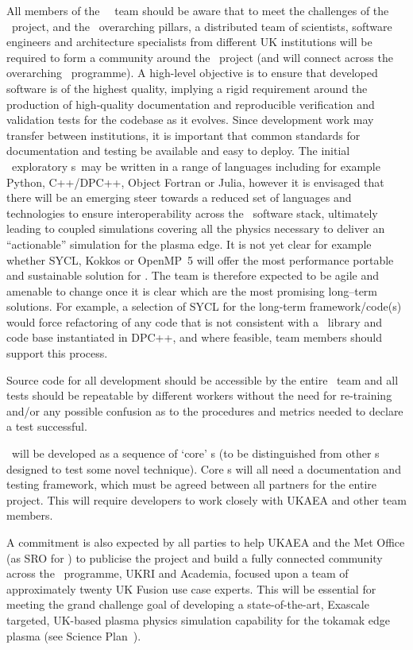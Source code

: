 All members of the \exc \   \nep \   team should be aware that 
to meet the challenges of the \nep \   project, and the \exc \   overarching 
pillars, a distributed team of scientists, software engineers and architecture 
specialists from different UK institutions will be required to form a community 
around the \nep \  project (and will connect across the overarching \exc \   
programme). A high-level objective is to ensure that developed software is of 
the highest quality, implying a rigid requirement around the production of 
high-quality documentation and reproducible verification and validation tests 
for the codebase as it evolves. Since development work may transfer between 
institutions, it is important that common standards for documentation and 
testing be available and easy to deploy. The initial \nep \   exploratory 
\Papp s~may be written in a range of languages including for example Python, 
C++/DPC++, Object Fortran or Julia, however it is envisaged that there will be 
an emerging steer towards a reduced set of languages and technologies to ensure 
interoperability across the \nep \   software stack, ultimately leading to 
coupled simulations covering all the physics necessary to deliver an 
``actionable'' simulation for the plasma edge. It is not yet clear for 
example whether SYCL, Kokkos or OpenMP~5 will offer the most performance 
portable and sustainable solution for \nep.
The team is therefore expected to be agile and amenable 
to change once it is clear which are the most promising long--term solutions. 
For example, a selection of SYCL for the long-term framework/code(s) would 
force refactoring of any code that is not consistent with a \nep \   library and 
code base instantiated in DPC++, and where feasible, team members 
should support this process.


Source code for all development should be accessible by the 
entire \nep \   team and all tests should be repeatable by different workers 
without the need for re-training and/or any possible confusion as to the 
procedures and metrics needed to declare a 
test successful.

\nep \   will be developed as a sequence of `core' \Papp s 
(to be distinguished from other \Papp s designed to test some novel 
technique). Core \Papp s will all need a documentation and testing framework, 
which must be agreed between all partners for the entire project. This will 
require developers to work closely with UKAEA and other team members.

A commitment is also expected by all parties to help UKAEA 
and the Met Office (as SRO for \exc) to publicise the project and build a 
fully connected community across the \exc \   programme, UKRI and Academia, 
focused upon a team of approximately twenty UK Fusion use case experts. This will 
be essential for meeting the grand challenge goal of developing a 
state-of-the-art, Exascale targeted, UK-based plasma physics simulation 
capability for the tokamak edge plasma (see Science Plan~\cite{sciplan}). 



